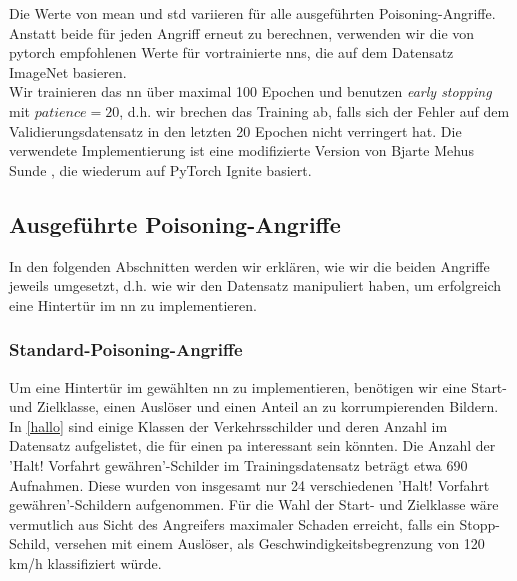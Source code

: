 \documentclass[twoside, 12pt,a4paper]{book}
\numberwithin{equation}{section}
\begin{document}
	\noindent Die Werte von mean und std variieren für alle ausgeführten Poisoning-Angriffe. Anstatt beide für jeden Angriff erneut zu berechnen, verwenden wir die von pytorch empfohlenen Werte für vortrainierte \acp{nn}, die auf dem Datensatz ImageNet\cite{imagenet} basieren.\\
	\noindent Wir trainieren das \ac{nn} über maximal 100 Epochen und benutzen \textit{early stopping} mit $patience=20$, d.h. wir brechen das Training ab, falls sich der Fehler auf dem Validierungsdatensatz in den letzten 20 Epochen nicht verringert hat. Die verwendete Implementierung ist eine modifizierte Version von Bjarte Mehus Sunde \cite{early-stopping-pytorch}, die wiederum auf PyTorch Ignite \cite{pytorch-ignite} basiert.\\
	
	\subsection{Ausgeführte Poisoning-Angriffe}
	In den folgenden Abschnitten werden wir erklären, wie wir die beiden Angriffe jeweils umgesetzt, d.h. wie wir den Datensatz manipuliert haben, um erfolgreich eine Hintertür im \ac{nn} zu implementieren.
	
	\subsubsection{Standard-Poisoning-Angriffe}
	Um eine Hintertür im gewählten \ac{nn} zu implementieren, benötigen wir eine Start- und Zielklasse, einen Auslöser und einen Anteil an zu korrumpierenden Bildern. \\
	
	\noindent In \autoref{hallo} sind einige Klassen der Verkehrsschilder und deren Anzahl im Datensatz aufgelistet, die für einen \ac{pa} interessant sein könnten. Die Anzahl der ’Halt! Vorfahrt gewähren’-Schilder im Trainingsdatensatz beträgt etwa 690 Aufnahmen. Diese wurden von insgesamt nur 24 verschiedenen ’Halt! Vorfahrt gewähren’-Schildern aufgenommen.
	Für die Wahl der Start- und Zielklasse wäre vermutlich aus Sicht des Angreifers maximaler Schaden erreicht, falls ein Stopp-Schild, versehen mit einem Auslöser, als Geschwindigkeitsbegrenzung von 120 km/h klassifiziert würde.
	
\end{document}
